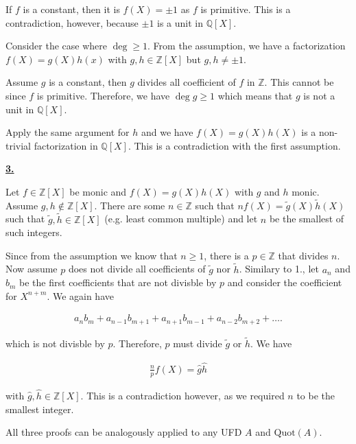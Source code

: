 \documentclass[a4paper]{article}
\theoremstyle{definition}
\begin{document}
\bigskip

\noindent If \(f\) is a constant, then it is \(f(X) = \pm 1\) as \(f\) is primitive. This is a contradiction, however, because \(\pm 1\) is a unit in \(\mathbb{Q}[X]\).

\bigskip

\noindent Consider the case where \(\deg \geq 1\). From the assumption, we have a factorization \(f(X) = g(X)h(x)\) with \(g, h \in \mathbb{Z}[X]\) but \(g, h \neq \pm 1\).

\bigskip

\noindent Assume \(g\) is a constant, then \(g\) divides all coefficient of \(f\) in \(\mathbb{Z}\). This cannot be since \(f\) is primitive. Therefore, we have \(\deg g \geq 1\) which means that \(g\) is not a unit in \(\mathbb{Q}[X]\).

\bigskip

\noindent Apply the same argument for \(h\) and we have \(f(X) = g(X)h(X)\) is a non-trivial factorization in \(\mathbb{Q}[X]\). This is a contradiction with the first assumption.

\bigskip

\noindent \underline{\textbf{3.}}

\noindent Let \(f \in \mathbb{Z}[X]\) be monic and \(f(X) = g(X)h(X)\) with \(g\) and \(h\) monic. Assume \(g, h \not\in \mathbb{Z}[X]\). There are some \(n \in \mathbb{Z}\) such that \(nf(X) = \tilde{g}(X) \tilde{h}(X)\) such that \(\tilde{g}, \tilde{h} \in \mathbb{Z}[X]\) (e.g. least common multiple) and let \(n\) be the smallest of such integers.

\bigskip

\noindent Since from the assumption we know that \(n \geq 1\), there is a \(p \in \mathbb{Z}\) that divides \(n\). Now assume \(p\) does not divide all coefficients of \(\tilde{g}\) nor \(\tilde{h}\). Similary to 1., let \(a_n\) and \(b_m\) be the first coefficients that are not divisble by \(p\) and consider the coefficient for \(X^{n+m}\). We again have

\begin{align}
    a_n b_m + a_{n - 1} b_{m+1} + a_{n + 1} b_{m - 1} + a_{n - 2} b_{m + 2} + \dots \text{.}
\end{align}

\noindent which is not divisble by \(p\). Therefore, \(p\) must divide \(\tilde{g}\) or \(\tilde{h}\). We have

\begin{align}
    \frac{n}{p} f(X) = \hat{g} \hat{h} 
\end{align}

\noindent with \(\hat{g}, \hat{h} \in \mathbb{Z}[X]\). This is a contradiction however, as we required \(n\) to be the smallest integer.

\bigskip
\bigskip

\noindent All three proofs can be analogously applied to any UFD \(A\) and \(\text{Quot}(A)\).
\end{document}
